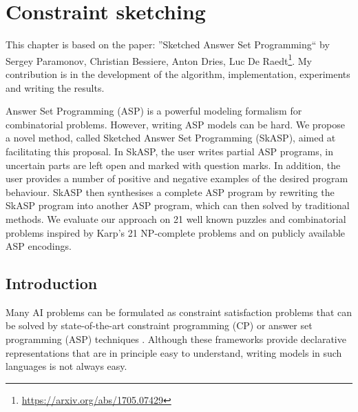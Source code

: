 \chapter{Constraint sketching} \label{ch:sketching}
This chapter is based on the paper: ''Sketched Answer Set Programming`` by Sergey Paramonov, Christian Bessiere, Anton Dries, Luc De Raedt\footnote{\url{https://arxiv.org/abs/1705.07429}}. My contribution is in the development of the algorithm, implementation, experiments and writing the results.


Answer Set Programming (ASP) is a powerful modeling formalism for combinatorial problems. However, writing ASP models can be hard. We propose a novel method, called Sketched Answer Set Programming (SkASP), aimed at facilitating this proposal. In SkASP, the user writes partial ASP programs, in uncertain parts are left open and marked with question marks. In addition, the user provides a number of positive and negative examples of the desired program behaviour. SkASP then synthesises a complete ASP program by rewriting the SkASP program into another ASP program, which can then solved by traditional methods. We evaluate our approach on 21 well known puzzles and combinatorial problems inspired by Karp’s 21 NP-complete problems and on publicly available ASP encodings.

\newcommand{\addedsket}[1]{#1\xspace}

\section{Introduction}\label{sec:intro}
Many AI problems can be formulated as constraint satisfaction problems that can
be solved by state-of-the-art constraint programming (CP)  \parencite{handbookcp} or answer set programming (ASP) techniques \parencite{whatisasp}. 
Although these frameworks provide declarative representations that are in principle
easy to understand, writing models in such languages is not always easy.


